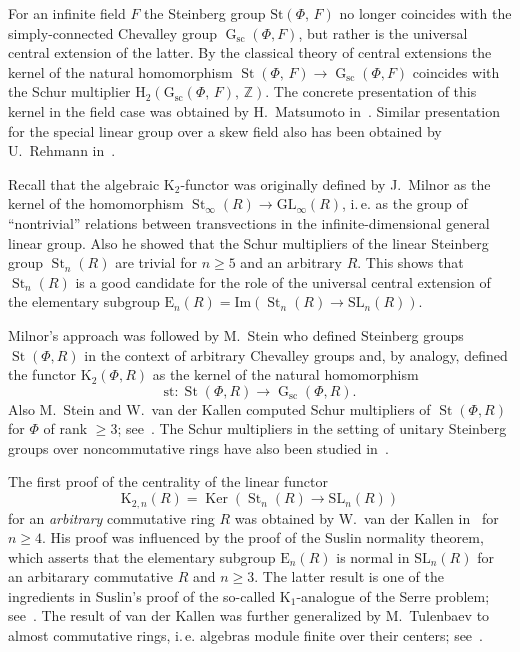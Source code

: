 \documentclass[oneside, 11pt]{amsart}
\numberwithin{equation}{section}
\theoremstyle{definition}
\theoremstyle{remark}
\DeclareMathOperator\St{St}
\DeclareMathOperator\Ker{Ker}
\DeclareMathOperator\GG{G}
\begin{document}
For an infinite field $F$ the Steinberg group $\mathrm{St}(\Phi,\,F)$ no longer coincides with the simply-connected Chevalley group $\GG_{\mathrm{sc}}(\Phi, F)$, but rather is the universal central extension of the latter.
By the classical theory of central extensions the kernel of the natural homomorphism $\St(\Phi,\,F)\to\GG_{\mathrm{sc}}(\Phi, F)$ coincides with the Schur multiplier $\mathrm H_2(\mathrm G_{\mathrm{sc}}(\Phi,\,F),\,\mathbb Z)$. The concrete presentation of this kernel in the field case was obtained by H.~Matsumoto in~\cite{Ma69}. Similar presentation for the special linear group over a skew field also has been obtained by U.~Rehmann in~\cite{Re78}.

Recall that the algebraic $\mathrm K_2$-functor was originally defined by J.~Milnor as the kernel of the homomorphism $\St_\infty(R) \to \mathrm{GL}_\infty(R)$, i.\,e. as the group of ``nontrivial'' relations between transvections in the infinite-dimensional general linear group. Also he showed that the Schur multipliers of the linear Steinberg group $\St_n(R)$ are trivial for $n \geq 5$ and an arbitrary $R$. This shows that $\St_n(R)$ is a good candidate for the role of the universal central extension of the elementary subgroup $\mathrm{E}_n(R) = \mathrm{Im}(\St_n(R) \to \mathrm{SL}_n(R))$.

Milnor's approach was followed by M.~Stein who defined Steinberg groups $\St(\Phi, R)$ in the context of arbitrary Chevalley groups and, by analogy,  defined the functor $\mathrm K_2(\Phi, R)$ as the kernel of the natural homomorphism \begin{equation}\label{eq:st}\mathrm{st}\colon \St(\Phi, R) \to \GG_{\mathrm{sc}}(\Phi, R).\end{equation} Also M.~Stein and W.~van der Kallen computed Schur multipliers of $\St(\Phi, R)$ for $\Phi$ of rank $\geq 3$; see~\cite{St71, vdKStein}. The Schur multipliers in the setting of unitary Steinberg groups over noncommutative rings have also been studied in~\cite{Bak, Tang, LavU, LavOU}.

The first proof of the centrality of the linear functor \[\mathrm K_{2,n}(R) = \Ker(\St_n(R) \to \mathrm{SL}_n(R))\] for an {\it arbitrary} commutative ring $R$ was obtained by W.~van der Kallen in~\cite{vdK} for $n \geq 4$. His proof was influenced by the proof of the Suslin normality theorem, which asserts that the elementary subgroup $\mathrm E_n(R)$ is normal in $\mathrm{SL}_n(R)$ for an arbitarary commutative $R$ and $n \geq 3$. The latter result is one of the ingredients in Suslin's proof of the so-called $\mathrm K_1$-analogue of the Serre problem; see~\cite{Suslin}. The result of van der Kallen was further generalized by M.~Tulenbaev to almost commutative rings, i.\,e. algebras module finite over their centers; see~\cite{Tul}.
\end{document}
